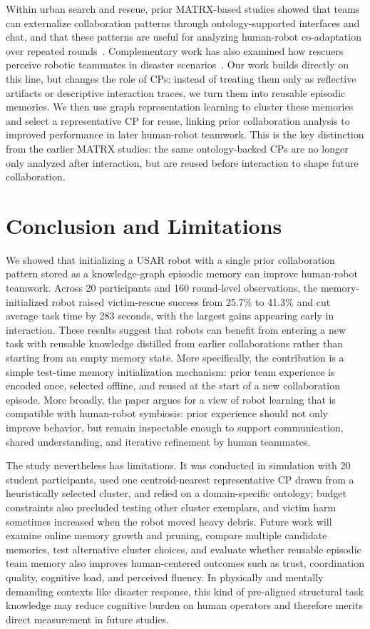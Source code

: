 \documentclass[letterpaper, 10 pt, conference]{ieeeconf}  %
\begin{document}
Within urban search and rescue, prior MATRX-based studies showed that teams can
externalize collaboration patterns through ontology-supported interfaces and chat, and
that these patterns are useful for analyzing human-robot co-adaptation over repeated
rounds~\cite{10.1145/3434074.3446354,vanZoelen2021,vanZoelen2022}. Complementary work
has also examined how rescuers perceive robotic teammates in disaster
scenarios~\cite{Betta2024RescuerPerceptions}. Our work builds directly on this line,
but changes the role of CPs: instead of treating them only as reflective artifacts or
descriptive interaction traces, we turn them into reusable episodic memories. We then
use graph representation learning to cluster these memories and select a representative
CP for reuse, linking prior collaboration analysis to improved performance in later
human-robot teamwork. This is the key distinction from the earlier MATRX studies: the
same ontology-backed CPs are no longer only analyzed after interaction, but are reused
before interaction to shape future collaboration.

\section{Conclusion and Limitations}
\label{sec:conclusion}


We showed that initializing a USAR robot with a single prior collaboration pattern
stored as a knowledge-graph episodic memory can improve human-robot teamwork. Across
20 participants and 160 round-level observations, the memory-initialized robot raised
victim-rescue success from 25.7\% to 41.3\% and cut average task time by 283 seconds, with
the largest gains appearing early in interaction. These results suggest that robots can
benefit from entering a new task with reusable knowledge distilled from earlier
collaborations rather than starting from an empty memory state. More specifically, the
contribution is a simple test-time memory initialization mechanism: prior team
experience is encoded once, selected offline, and reused at the start of a new
collaboration episode. More broadly, the paper argues for a view of robot learning
that is compatible with human-robot symbiosis: prior experience should not only
improve behavior, but remain inspectable enough to support communication, shared
understanding, and iterative refinement by human teammates.

The study nevertheless has limitations. It was conducted in simulation with 20 student
participants, used one centroid-nearest representative CP drawn from a heuristically
selected cluster, and relied on a domain-specific ontology; budget constraints also
precluded testing other cluster exemplars, and victim harm sometimes increased when the
robot moved heavy debris. Future work will examine online memory growth and pruning,
compare multiple candidate memories, test alternative cluster choices, and evaluate
whether reusable episodic team memory also improves human-centered outcomes such as
trust, coordination quality, cognitive load, and perceived fluency. In physically and
mentally demanding contexts like disaster response, this kind of pre-aligned structural
task knowledge may reduce cognitive burden on human operators and therefore merits
direct measurement in future studies.



\end{document}
